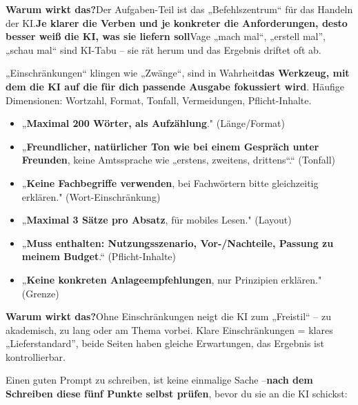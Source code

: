 \textbf{Warum wirkt das?}Der Aufgaben-Teil ist das „Befehlszentrum“ für das Handeln der KI.\textbf{Je klarer die Verben und je konkreter die Anforderungen, desto besser weiß die KI, was sie liefern soll}Vage „mach mal“, „erstell mal”, „schau mal“ sind KI-Tabu – sie rät herum und das Ergebnis driftet oft ab.


„Einschränkungen“ klingen wie „Zwänge“, sind in Wahrheit\textbf{das Werkzeug, mit dem die KI auf die für dich passende Ausgabe fokussiert wird}. Häufige Dimensionen: Wortzahl, Format, Tonfall, Vermeidungen, Pflicht-Inhalte.


\begin{itemize}
  \item „\textbf{Maximal 200 Wörter, als Aufzählung}." (Länge/Format)
  \item „\textbf{Freundlicher, natürlicher Ton wie bei einem Gespräch unter Freunden}, keine Amtssprache wie „erstens, zweitens, drittens“.“ (Tonfall)
  \item „\textbf{Keine Fachbegriffe verwenden}, bei Fachwörtern bitte gleichzeitig erklären." (Wort-Einschränkung)
  \item „\textbf{Maximal 3 Sätze pro Absatz}, für mobiles Lesen." (Layout)
  \item „\textbf{Muss enthalten: Nutzungsszenario, Vor-/Nachteile, Passung zu meinem Budget}.“ (Pflicht-Inhalte)
  \item „\textbf{Keine konkreten Anlageempfehlungen}, nur Prinzipien erklären." (Grenze)
\end{itemize}

\textbf{Warum wirkt das?}Ohne Einschränkungen neigt die KI zum „Freistil“ – zu akademisch, zu lang oder am Thema vorbei. Klare Einschränkungen = klares „Lieferstandard”, beide Seiten haben gleiche Erwartungen, das Ergebnis ist kontrollierbar.


Einen guten Prompt zu schreiben, ist keine einmalige Sache –\textbf{nach dem Schreiben diese fünf Punkte selbst prüfen}, bevor du sie an die KI schickst:

